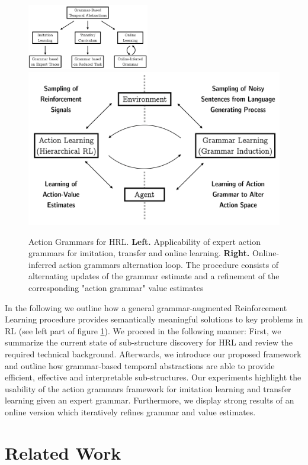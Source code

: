 \documentclass[colorinlistoftodos]{article}
\theoremstyle{definition}
\begin{document}
\begin{figure}[H]
    \centering
    \includegraphics[width=0.475\textwidth]{figures/concept_applications.png}
    \includegraphics[width=0.475\linewidth]{figures/concept_al_gl.png}
    \caption{Action Grammars for HRL. \textbf{Left.} Applicability of expert action grammars for imitation, transfer and online learning. \textbf{Right.} Online-inferred action grammars alternation loop. The procedure consists of alternating updates of the grammar estimate and a refinement of the corresponding "action grammar" value estimates}
    \label{fig:loop_ag}
\end{figure}

In the following we outline how a general grammar-augmented Reinforcement Learning procedure provides semantically meaningful solutions to key problems in RL (see left part of figure \ref{fig:loop_ag}).
We proceed in the following manner: First, we summarize the current state of sub-structure discovery for HRL and review the required technical background. Afterwards, we introduce our proposed framework and outline how grammar-based temporal abstractions are able to provide efficient, effective and interpretable sub-structures. Our experiments highlight the usability of the action grammars framework for imitation learning and transfer learning given an expert grammar. Furthermore, we display strong results of an online version which iteratively refines grammar and value estimates. 

\section{Related Work}
\end{document}
